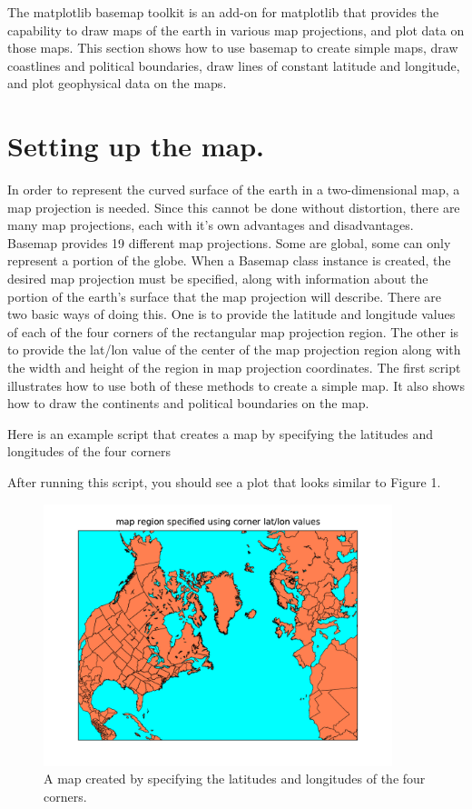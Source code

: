 The matplotlib basemap toolkit is an add-on for matplotlib that provides
the capability to draw maps of the earth in various map projections,
and plot data on those maps. This section shows how to use basemap
to create simple maps, draw coastlines and political boundaries, draw
lines of constant latitude and longitude, and plot geophysical data
on the maps.


\section{Setting up the map.}

In order to represent the curved surface of the earth in a two-dimensional
map, a map projection is needed. Since this cannot be done without
distortion, there are many map projections, each with it's own advantages
and disadvantages. Basemap provides 19 different map projections.
Some are global, some can only represent a portion of the globe. When
a Basemap class instance is created, the desired map projection must
be specified, along with information about the portion of the earth's
surface that the map projection will describe. There are two basic
ways of doing this. One is to provide the latitude and longitude values
of each of the four corners of the rectangular map projection region.
The other is to provide the lat/lon value of the center of the map
projection region along with the width and height of the region in
map projection coordinates. The first script illustrates how to use
both of these methods to create a simple map. It also shows how to
draw the continents and political boundaries on the map.

Here is an example script that creates a map by specifying the latitudes
and longitudes of the four corners



After running this script, you should see a plot that looks similar
to Figure 1.

\begin{figure}[h]
\includegraphics[width=4in]{fig/basemap1}

\caption{A map created by specifying the latitudes and longitudes of the four
corners.}

\end{figure}

